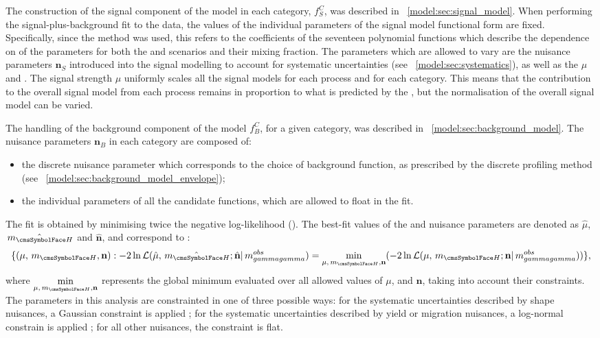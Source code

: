 The construction of the signal component of the model in each category, $f^C_S$, was described in \Sec~\ref{model:sec:signal_model}. When performing the signal-plus-background fit to the data, the values of the individual parameters of the signal model functional form are fixed. Specifically, since the \SSF method was used, this refers to the coefficients of the seventeen polynomial functions which describe the dependence on \mH of the \DCBpG parameters for both the \RV and \WV scenarios and their mixing fraction. The parameters which are allowed to vary are the nuisance parameters $\mathbf{n}_S$ introduced into the signal modelling to account for systematic uncertainties (see \Sec~\ref{model:sec:systematics}), as well as the \POI\s $\mu$ and \mH. The signal strength $\mu$ uniformly scales all the signal models for each process and for each category. This means that the contribution to the overall signal model from each process remains in proportion to what is predicted by the \SM, but the normalisation of the overall signal model can be varied.

The handling of the background component of the model $f^C_B$, for a given category, was described in \Sec~\ref{model:sec:background_model}. The nuisance parameters $\mathbf{n}_B$ in each category are composed of:
\begin{itemize}
\item the discrete nuisance parameter which corresponds to the choice of background function, as prescribed by the discrete profiling method (see \Sec~\ref{model:sec:background_model_envelope}); 
\item the individual parameters of all the candidate functions, which are allowed to float in the fit.
\end{itemize}

The fit is obtained by minimising twice the negative log-likelihood (\NLL). 
The best-fit values of the \POI\s and nuisance parameters are denoted as $\hat{\mu}$, $\hat{\mH}$ and $\hat{\mathbf{n}}$, and correspond to :
\begin{equation}
\{ (\mu, \mH, \mathbf{n}) : -2 \ln \mathcal{L}(\hat{\mu}, \hat{\mH} ;\hat{\mathbf{n}}| \mgg^{obs}) = \min _{\mu,\mH , \mathbf{n}}(-2 \ln \mathcal{L}(\mu, \mH; \mathbf{n}| \mgg^{obs})) \},
\end{equation}
where $\displaystyle\min_{ \mu, \mH ,\mathbf{n}}$ represents the global minimum evaluated over all allowed values of $\mu$, \mH and $\mathbf{n}$, taking into account their constraints. The parameters in this analysis are constrainted in one of three possible ways: for the systematic uncertainties described by shape nuisances, a Gaussian constraint is applied ; for the systematic uncertainties described by yield or migration nuisances, a log-normal constrain is applied ; for all other nuisances, the constraint is flat. 

